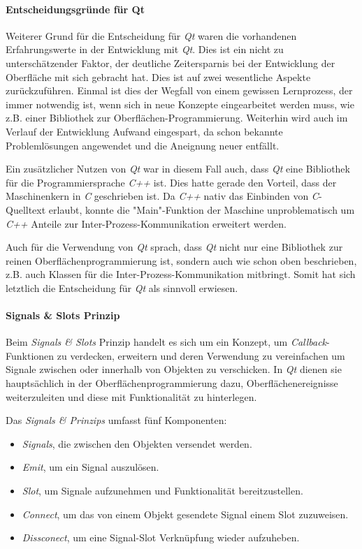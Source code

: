\paragraph{Entscheidungsgründe für Qt}
Weiterer Grund für die Entscheidung für \emph{Qt} waren die vorhandenen Erfahrungswerte in der Entwicklung mit \emph{Qt}. Dies ist ein nicht zu unterschätzender Faktor, der deutliche Zeitersparnis bei der Entwicklung der Oberfläche mit sich gebracht hat. Dies ist auf zwei wesentliche Aspekte zurückzuführen. Einmal ist dies der Wegfall von einem gewissen Lernprozess, der immer notwendig ist, wenn sich in neue Konzepte eingearbeitet werden muss, wie z.B. einer Bibliothek zur Oberflächen-Programmierung. Weiterhin wird auch im Verlauf der Entwicklung Aufwand eingespart, da schon bekannte Problemlösungen angewendet und die Aneignung neuer entfällt.

Ein zusätzlicher Nutzen von \emph{Qt} war in diesem Fall auch, dass \emph{Qt} eine Bibliothek für die Programmiersprache \emph{C++} ist. Dies hatte gerade den Vorteil, dass der Maschinenkern in \emph{C} geschrieben ist. Da \emph{C++} nativ das Einbinden von \emph{C}-Quelltext erlaubt, konnte die "Main"-Funktion der Maschine unproblematisch um \emph{C++} Anteile zur Inter-Prozess-Kommunikation erweitert werden.

Auch für die Verwendung von \emph{Qt} sprach, dass \emph{Qt} nicht nur eine Bibliothek zur reinen Oberflächenprogrammierung ist, sondern auch wie schon oben beschrieben, z.B. auch Klassen für die Inter-Prozess-Kommunikation mitbringt. Somit hat sich letztlich die Entscheidung für \emph{Qt} als sinnvoll erwiesen.

\paragraph{Signals \& Slots Prinzip}
Beim \emph{Signals \& Slots} Prinzip handelt es sich um ein Konzept, um \emph{Callback}-Funktionen zu verdecken, erweitern und deren Verwendung zu vereinfachen um Signale zwischen oder innerhalb von Objekten zu verschicken. In \emph{Qt} dienen sie hauptsächlich in der Oberflächenprogrammierung dazu, Oberflächenereignisse weiterzuleiten und diese mit Funktionalität zu hinterlegen.

Das \emph{Signals \& Prinzips }umfasst fünf Komponenten:
\begin{itemize}
\item \emph{Signals}, die zwischen den Objekten versendet werden.
\item \emph{Emit}, um ein Signal auszulösen.
\item \emph{Slot}, um Signale aufzunehmen und Funktionalität bereitzustellen.
\item \emph{Connect}, um das von einem Objekt gesendete Signal einem Slot zuzuweisen.
\item \emph{Dissconect}, um eine Signal-Slot Verknüpfung wieder aufzuheben.
\end{itemize}

